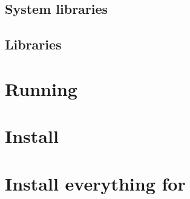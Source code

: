\documentclass[%
  figures=plain,%
  listof=totoc,%
  bibliography=totoc,%
  fleqn,%
]{bootstrap_dlrreprt}                           %
\begin{document}
\newpage
\section{System libraries}	\label{sec:System_libraries}
\setcounter{currentlevel}{5}


\newpage
\section{Libraries}
\setcounter{currentlevel}{5}





\newpage
\section{\texorpdfstring{\protect\marktool{\toolnameshort}}{\toolnameshort{}}}
\setcounter{currentlevel}{5}


% 


\chapter{Running \texorpdfstring{\protect\marktool{\toolnameshort}}{\toolnameshort{}}}
\setcounter{currentlevel}{6}



\chapter{Install \texorpdfstring{\protect\marktool{\paraviewname}}{\paraviewname{}}}
\setcounter{currentlevel}{6}



\chapter{Install everything for \texorpdfstring{\protect\marktool{\fetranslatorname}}{\fetranslatorname{}}}
\setcounter{currentlevel}{6}



\printbibliography



\end{document}
